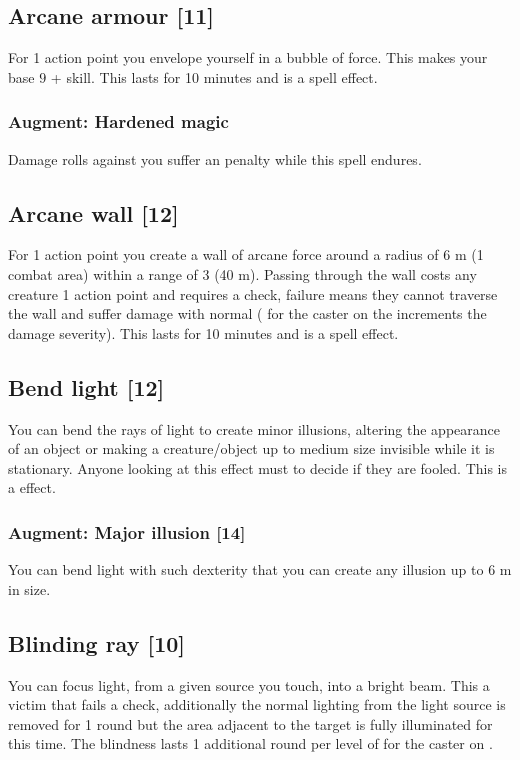 \subsection{Arcane armour [11]}
\label{spell:arcane-armour}
For 1 action point you envelope yourself in a bubble of force. This makes your base  $9$ +  skill. This lasts for 10 minutes and is a  spell effect.
\subsubsection{Augment: Hardened magic}
Damage rolls against you suffer an  penalty while this spell endures.


\subsection{Arcane wall [12]}
For 1 action point you create a wall of arcane force around a radius of 6 m (1 combat area) within a range of 3 (40 m). Passing through the wall costs any creature 1 action point and requires a  check, failure means they cannot traverse the wall and suffer damage with normal  ( for the caster on the  increments the damage severity). This lasts for 10 minutes and is a  spell effect.


\subsection{Bend light [12]}
\label{spell:bend-light}
You can bend the rays of light to create minor illusions, altering the appearance of an object or making a creature/object up to medium size invisible while it is stationary. Anyone looking at this effect must  to decide if they are fooled. This is a  effect.
\subsubsection{Augment: Major illusion [14]}
You can bend light with such dexterity that you can create any illusion up to 6 m in size. 


\subsection{Blinding ray [10]}
\label{spell:blind-ray}
You can focus light, from a given source you touch, into a bright beam. This  a victim that fails a  check, additionally the normal lighting from the light source is removed for 1 round but the area adjacent to the target is fully illuminated for this time. The blindness lasts 1 additional round per level of  for the caster on .


